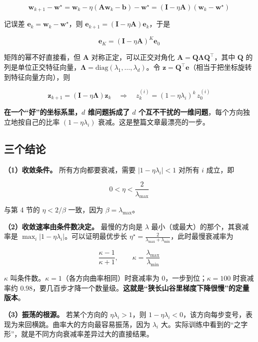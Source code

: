 \documentclass[UTF8, a4paper, zihao=-4, fontset=none]{ctexart}
\begin{document}
\[
\mathbf{w}_{k+1}-\mathbf{w}^\star
=\mathbf{w}_k-\eta(\mathbf{A}\mathbf{w}_k-\mathbf{b})-\mathbf{w}^\star
=(\mathbf{I}-\eta\mathbf{A})(\mathbf{w}_k-\mathbf{w}^\star)
\]


记误差 $\mathbf{e}_k=\mathbf{w}_k-\mathbf{w}^\star$，则 $\mathbf{e}_{k+1}=(\mathbf{I}-\eta\mathbf{A})\mathbf{e}_k$，于是


\[
\mathbf{e}_K=(\mathbf{I}-\eta\mathbf{A})^K\mathbf{e}_0
\]


矩阵的幂不好直接看，但 $\mathbf{A}$ 对称正定，可以正交对角化 $\mathbf{A}=\mathbf{Q}\bm{\Lambda}\mathbf{Q}^\top$，其中 $\mathbf{Q}$ 的列是单位正交特征向量，$\bm{\Lambda}=\mathrm{diag}(\lambda_1,\dots,\lambda_d)$。令 $\mathbf{z}=\mathbf{Q}^\top\mathbf{e}$（相当于把坐标旋转到特征向量方向），则


\[
\mathbf{z}_{k+1}=(\mathbf{I}-\eta\bm{\Lambda})\mathbf{z}_k
\quad\Longrightarrow\quad
z_k^{(i)}=(1-\eta\lambda_i)^k\,z_0^{(i)}
\]


\textbf{在一个“好”的坐标系里，$d$ 维问题拆成了 $d$ 个互不干扰的一维问题}，每个方向独立地按自己的比率 $(1-\eta\lambda_i)$ 衰减。这是整篇文章最漂亮的一步。




\subsection{三个结论}



\textbf{（1）收敛条件。} 所有方向都要衰减，需要 $|1-\eta\lambda_i|<1$ 对所有 $i$ 成立，即


\[
0<\eta<\frac{2}{\lambda_{\max}}
\]


与第 4 节的 $\eta<2/\beta$ 一致，因为 $\beta=\lambda_{\max}$。



\textbf{（2）收敛速率由条件数决定。} 最慢的方向是 $\lambda$ 最小（或最大）的那个，其衰减率是 $\max_i|1-\eta\lambda_i|$。可以证明最优步长 $\eta^\star=\frac{2}{\lambda_{\max}+\lambda_{\min}}$，此时最慢衰减率为


\[
\frac{\kappa-1}{\kappa+1},\qquad \kappa=\frac{\lambda_{\max}}{\lambda_{\min}}
\]


$\kappa$ 叫条件数。$\kappa=1$（各方向曲率相同）时衰减率为 0，一步到位；$\kappa=100$ 时衰减率约 $0.98$，要几百步才降一个数量级。\textbf{这就是“狭长山谷里梯度下降很慢”的定量版本}。



\textbf{（3）振荡的根源。} 若某个方向的 $\eta\lambda_i>1$，则 $1-\eta\lambda_i<0$，该方向每步变号，表现为来回横跳。曲率大的方向最容易振荡，因为 $\lambda_i$ 大。实际训练中看到的“之字形”，就是不同方向衰减率差异过大的直接结果。
\end{document}
